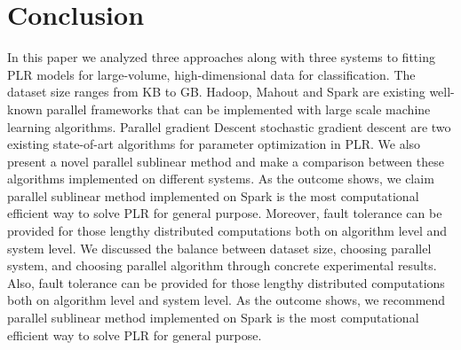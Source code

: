 \documentclass{llncs}
\begin{document}
\section{Conclusion} \label{sec:concl}
In this paper we analyzed three approaches along with three systems to fitting PLR models for large-volume, high-dimensional data for classification.
The dataset size ranges from KB to GB.
Hadoop, Mahout and Spark are existing well-known parallel frameworks that can be implemented with large scale machine learning algorithms.
Parallel gradient Descent stochastic gradient descent are two existing state-of-art algorithms for parameter optimization in PLR.
We also present a novel parallel sublinear method and make a comparison between these algorithms implemented on different systems.
As the outcome shows, we claim parallel sublinear method implemented on Spark is the most computational efficient way to solve PLR for general purpose.
Moreover, fault tolerance can be provided for those lengthy distributed computations both on algorithm level and system level.
We discussed the balance between dataset size, choosing parallel system, and choosing parallel algorithm through concrete experimental results.
Also, fault tolerance can be provided for those lengthy distributed computations both on algorithm level and system level.
As the outcome shows, we recommend parallel sublinear method implemented on Spark is the most computational efficient way to solve PLR for general purpose.

\begin{small}


\end{small}
\end{document}
